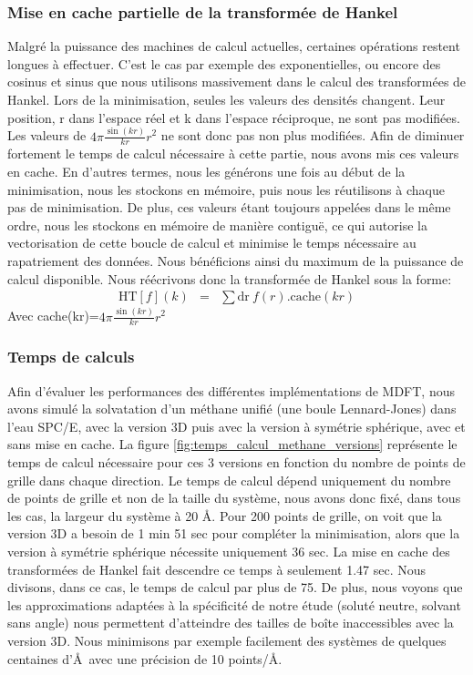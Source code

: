 \subsubsection{Mise en cache partielle de la transformée de Hankel}
Malgré la puissance des machines de calcul actuelles, certaines opérations restent longues à effectuer. C'est le cas par exemple des exponentielles, ou encore des cosinus et sinus que nous utilisons massivement dans le calcul des transformées de Hankel.
Lors de la minimisation, seules les valeurs des densités changent. Leur position, r dans l'espace réel et k dans l'espace réciproque, ne sont pas modifiées. Les valeurs de $4\pi\frac{\sin(kr)}{kr}r^2$ ne sont donc pas non plus modifiées. Afin de diminuer fortement le temps de calcul nécessaire à cette partie, nous avons mis ces valeurs en cache. En d'autres termes, nous les générons une fois au début de la minimisation, nous les stockons en mémoire, puis nous les réutilisons à chaque pas de minimisation. De plus, ces valeurs étant toujours appelées dans le même ordre, nous les stockons en mémoire de manière contiguë, ce qui autorise la vectorisation de cette boucle de calcul et minimise le temps nécessaire au rapatriement des données. Nous bénéficions ainsi du maximum de la puissance de calcul disponible. Nous réécrivons donc la transformée de Hankel sous la forme:
\begin{eqnarray}
\mathrm{HT}[f](k) &=& \sum \mathrm{dr}\ f(r) . \mathrm{cache}(kr)
\end{eqnarray}
Avec cache(kr)=$4\pi\frac{\sin(kr)}{kr}r^2$


\subsubsection{Temps de calculs}
Afin d'évaluer les performances des différentes implémentations de MDFT, nous avons simulé la solvatation d'un méthane unifié (une boule Lennard-Jones) dans l'eau SPC/E, avec la version 3D puis avec la version à symétrie sphérique, avec et sans mise en cache.
La figure \ref{fig:temps_calcul_methane_versions} représente le temps de calcul nécessaire pour ces 3 versions en fonction du nombre de points de grille dans chaque direction.
Le temps de calcul dépend uniquement du nombre de points de grille et non de la taille du système, nous avons donc fixé, dans tous les cas, la largeur du système à 20 \AA.
Pour 200 points de grille, on voit que la version 3D a besoin de 1 min 51 sec pour compléter la minimisation, alors que la version à symétrie sphérique nécessite uniquement 36 sec.
La mise en cache des transformées de Hankel fait descendre ce temps à seulement 1.47 sec.
Nous divisons, dans ce cas, le temps de calcul par plus de 75.
De plus, nous voyons que les approximations adaptées à la spécificité de notre étude (soluté neutre, solvant sans angle) nous permettent d'atteindre des tailles de boîte inaccessibles avec la version 3D.
Nous minimisons par exemple facilement des systèmes de quelques centaines d'\AA\ avec une précision de 10 points/\AA.



